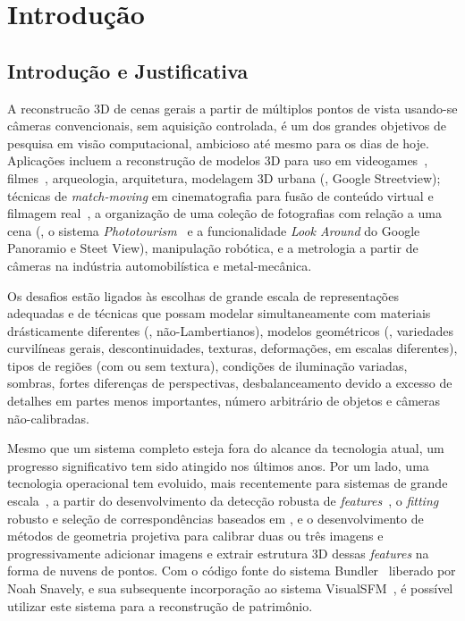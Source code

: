 \chapter*{Introdução} \label{cap:intro}

\section{Introdução e Justificativa}

A reconstrucão 3D de cenas gerais a partir de múltiplos pontos de vista
usando-se câmeras convencionais, sem aquisição controlada, é um dos grandes
objetivos de pesquisa em visão computacional, ambicioso até mesmo para os dias
de hoje. Aplicações incluem a reconstrução de modelos 3D para uso em
videogames~\cite{Ablan:3DPhoto:book}, filmes~\cite{Ablan:3DPhoto:book},
arqueologia, arquitetura, modelagem 3D urbana (\eg, Google Streetview); técnicas
de \emph{match-moving} em cinematografia para fusão de conteúdo virtual e
filmagem real~\cite{Dobbert:Matchmoving:book}, a organização de uma coleção de
fotografias com relação a uma cena (\eg, o sistema
\emph{Phototourism}~\cite{Argarwal:Snavely:etal:ICCV09} e a funcionalidade
\emph{Look Around} do Google Panoramio e Steet View), manipulação robótica, e a
metrologia a partir de câmeras na indústria automobilística e metal-mecânica.

Os desafios estão ligados às escolhas de grande escala de
representações adequadas e de técnicas que possam modelar simultaneamente com
materiais drásticamente diferentes (\eg, não-Lambertianos), modelos
geométricos (\eg, variedades curvilíneas gerais, descontinuidades, texturas,
deformações, em escalas diferentes), tipos de regiões (com ou sem textura),
condições de iluminação variadas, sombras, fortes diferenças de perspectivas,
desbalanceamento devido a excesso de detalhes em partes menos importantes,
número arbitrário de objetos e câmeras não-calibradas.

Mesmo que um sistema completo esteja fora do alcance da tecnologia atual,
um progresso significativo tem sido atingido nos últimos anos. Por um lado,
uma tecnologia operacional tem evoluido, mais recentemente para sistemas de grande
escala~\cite{Argarwal:Snavely:etal:ICCV09,Pollefeys:VanGool:etal:handheld:IJCV2004},
a partir do desenvolvimento da detecção robusta de
\emph{features}~\cite{mikolajczyk:schmid:IJCV04}, o
\emph{fitting} robusto e seleção de correspondências baseados em \ransac, e o
desenvolvimento de métodos de geometria projetiva para calibrar duas ou três
imagens e progressivamente adicionar imagens e extrair estrutura 3D dessas
\emph{features} na forma de nuvens de pontos. Com o código fonte do sistema
Bundler~\cite{Noah:Bundler,Noah:Steven:Bundler} liberado por Noah Snavely, e sua subsequente incorporação
ao sistema VisualSFM~\cite{Changchang:VisualSFM}, é possível utilizar este sistema para a
reconstrução de patrimônio. 


